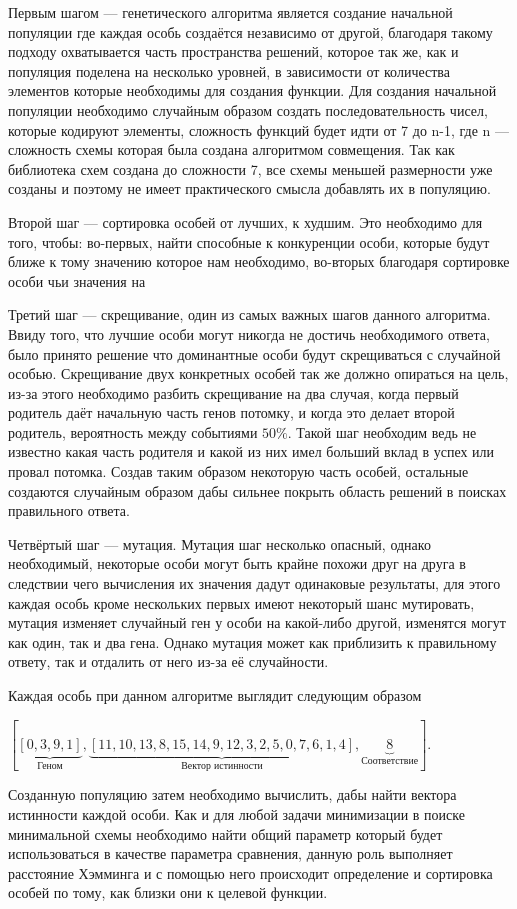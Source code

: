 \documentclass[14pt]{extarticle} %
\begin{document}
Первым шагом --- генетического алгоритма является создание начальной популяции где каждая особь создаётся независимо от другой, благодаря такому подходу охватывается часть пространства решений, которое так же, как и популяция поделена на несколько уровней, в зависимости от количества элементов которые необходимы для создания функции. Для создания начальной популяции необходимо случайным образом создать последовательность чисел, которые кодируют элементы, сложность функций будет идти от 7 до n-1, где n --- сложность схемы которая была создана алгоритмом совмещения. Так как библиотека схем создана до сложности 7, все схемы меньшей размерности уже созданы и поэтому не имеет практического смысла добавлять их в популяцию.\par
Второй шаг --- сортировка особей от лучших, к худшим. Это необходимо для того, чтобы: во-первых, найти  способные к конкуренции особи, которые будут ближе к тому значению которое нам необходимо, во-вторых благодаря сортировке особи чьи значения на\par
Третий шаг --- скрещивание, один из самых важных шагов данного алгоритма. Ввиду того, что лучшие особи могут никогда не достичь необходимого ответа, было принято решение что доминантные особи будут скрещиваться с случайной особью. Скрещивание двух конкретных особей так же должно опираться на цель, из-за этого необходимо разбить скрещивание на два случая, когда первый родитель даёт начальную часть генов потомку, и когда это делает второй родитель, вероятность между событиями $50\%$. Такой шаг необходим ведь не известно какая часть родителя и какой из них имел больший вклад в успех или провал потомка. Создав таким образом некоторую часть особей, остальные создаются случайным образом дабы сильнее покрыть область решений в поисках правильного ответа.\par
Четвёртый шаг --- мутация. Мутация шаг несколько опасный, однако необходимый, некоторые особи могут быть крайне похожи друг на друга в следствии чего вычисления их значения дадут одинаковые результаты, для этого каждая особь кроме нескольких первых имеют некоторый шанс мутировать, мутация изменяет случайный ген у особи на какой-либо другой, изменятся могут как один, так и два гена. Однако мутация может как приблизить к правильному ответу, так и отдалить от него из-за её случайности.\par

Каждая особь при данном алгоритме выглядит следующим образом\par
$[\underbrace{[0, 3, 9, 1]}_\text{Геном} , \underbrace{[11, 10, 13, 8, 15, 14, 9, 12, 3, 2, 5, 0, 7, 6, 1, 4]}_\text{Вектор истинности}, \underbrace{8}_\text{Соответствие}]$.\par
\noindent Созданную популяцию затем необходимо вычислить, дабы найти вектора истинности каждой особи. Как и для любой задачи минимизации в поиске минимальной схемы необходимо найти общий параметр который будет использоваться в качестве параметра сравнения, данную роль выполняет расстояние Хэмминга и с помощью него происходит определение и сортировка особей по тому, как близки они к целевой функции.
\end{document}
